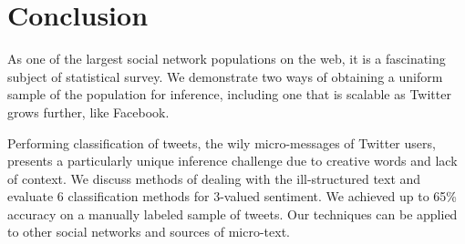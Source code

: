 \section{Conclusion}

As one of the largest social network populations on the web, it is a fascinating subject of statistical survey. We demonstrate two ways of obtaining a uniform sample of the population for inference, including one that is scalable as Twitter grows further, like Facebook.

Performing classification of tweets, the wily micro-messages of Twitter users, presents a particularly unique inference challenge due to creative words and lack of context. We discuss methods of dealing with the ill-structured text and evaluate 6 classification methods for 3-valued sentiment. We achieved up to 65\% accuracy on a manually labeled sample of tweets. Our techniques can be applied to other social networks and sources of micro-text.
